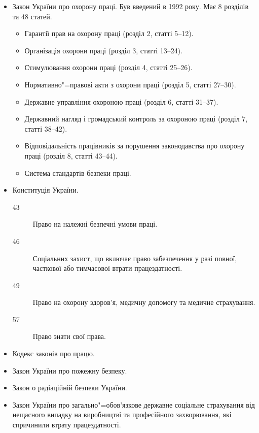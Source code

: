 \documentclass[a5paper,10pt,notitlepage,pdftex,headsepline]{scrartcl}
\begin{document}
  \begin{itemize}
    \item Закон України про охорону праці.
      Був введений в 1992 року.
      Має 8 розділів та 48 статей.
      \begin{itemize}
        \item Гарантії прав на охорону праці (розділ 2, статті 5--12).
        \item Організація охорони праці (розділ 3, статті 13--24).
        \item Стимулювання охорони праці (розділ 4, статті 25--26).
        \item Нормативно"=правові акти з охорони праці (розділ 5, статті
          27--30).
        \item Державне управління охороною праці (розділ 6, статті 31--37).
        \item Державний нагляд і громадський контроль за охороною праці
          (розділ 7, статті 38--42).
        \item Відповідальність працівників за порушення законодавства про
          охорону праці (розділ 8, статті 43--44).
        \item Система стандартів безпеки праці.
      \end{itemize}
    \item Конституція України.
      \begin{description}
        \item[43] Право на належні безпечні умови праці.
        \item[46] Соціальних захист, що включає право забезпечення у разі
          повної, часткової або тимчасової втрати працездатності.
        \item[49] Право на охорону здоров’я, медичну допомогу та медичне
          страхування.
        \item[57] Право знати свої права.
      \end{description}
    \item Кодекс законів про працю.
    \item Закон України про пожежну безпеку.
    \item Закон о радіаційній безпеки України.
    \item Закон України про загально"=обов’язкове державне соціальне страхування
      від нещасного випадку на виробництві та професійного захворювання, які
      спричинили втрату працездатності.
  \end{itemize}
\end{document}
